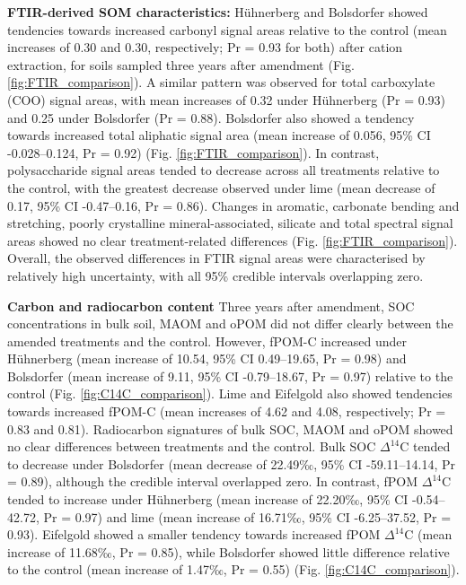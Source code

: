 \documentclass[preprint,12pt]{elsarticle}
\begin{document}
\textbf{FTIR-derived SOM characteristics:}
  Hühnerberg and Bolsdorfer showed tendencies towards increased carbonyl signal areas relative to the control (mean increases of 0.30 and 0.30, respectively; Pr = 0.93 for both) after cation extraction, for soils sampled three years after amendment (Fig. \ref{fig:FTIR_comparison}). A similar pattern was observed for total carboxylate (COO) signal areas, with mean increases of 0.32 under Hühnerberg (Pr = 0.93) and 0.25 under Bolsdorfer (Pr = 0.88). Bolsdorfer also showed a tendency towards increased total aliphatic signal area (mean increase of 0.056, 95\% CI -0.028–0.124, Pr = 0.92) (Fig. \ref{fig:FTIR_comparison}).
  In contrast, polysaccharide signal areas tended to decrease across all treatments relative to the control, with the greatest decrease observed under lime (mean decrease of 0.17, 95\% CI -0.47–0.16, Pr = 0.86). Changes in aromatic, carbonate bending and stretching, poorly crystalline mineral-associated, silicate and total spectral signal areas showed no clear treatment-related differences (Fig. \ref{fig:FTIR_comparison}). Overall, the observed differences in FTIR signal areas were characterised by relatively high uncertainty, with all 95\% credible intervals overlapping zero.

\textbf{Carbon and radiocarbon content}
  Three years after amendment, SOC concentrations in bulk soil, MAOM and oPOM did not differ clearly between the amended treatments and the control. However, fPOM-C increased under Hühnerberg (mean increase of 10.54, 95\% CI 0.49–19.65, Pr = 0.98) and Bolsdorfer (mean increase of 9.11, 95\% CI -0.79–18.67, Pr = 0.97) relative to the control (Fig. \ref{fig:C14C_comparison}). Lime and Eifelgold also showed tendencies towards increased fPOM-C (mean increases of 4.62 and 4.08, respectively; Pr = 0.83 and 0.81).
  Radiocarbon signatures of bulk SOC, MAOM and oPOM showed no clear differences between treatments and the control. Bulk SOC $\Delta^{14}$C tended to decrease under Bolsdorfer (mean decrease of 22.49‰, 95\% CI -59.11–14.14, Pr = 0.89), although the credible interval overlapped zero. In contrast, fPOM $\Delta^{14}$C tended to increase under Hühnerberg (mean increase of 22.20‰, 95\% CI -0.54–42.72, Pr = 0.97) and lime (mean increase of 16.71‰, 95\% CI -6.25–37.52, Pr = 0.93). Eifelgold showed a smaller tendency towards increased fPOM $\Delta^{14}$C (mean increase of 11.68‰, Pr = 0.85), while Bolsdorfer showed little difference relative to the control (mean increase of 1.47‰, Pr = 0.55) (Fig. \ref{fig:C14C_comparison}).
\end{document}
